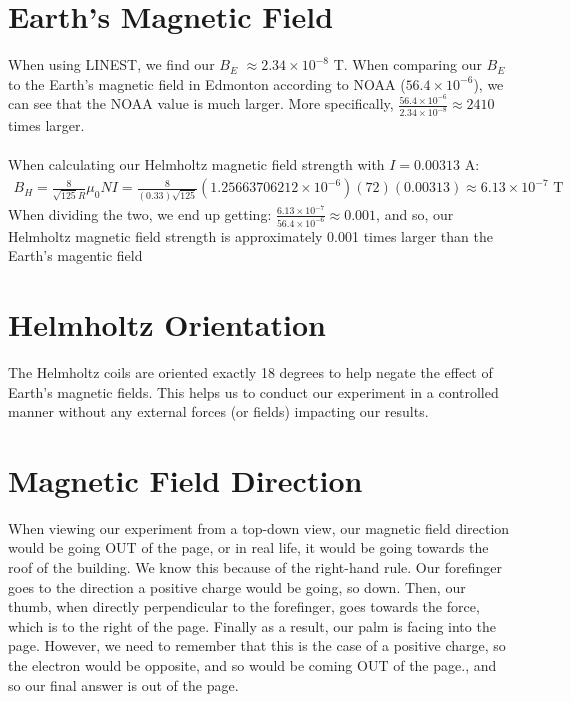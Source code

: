 \documentclass[12pt]{article}
\begin{document}
\section{Earth's Magnetic Field}
When using LINEST, we find our $B_E$ $\approx 2.34 \times 10^{-8}$ T.
When comparing our $B_E$ to the Earth's magnetic field in Edmonton according to NOAA ($56.4 \times 10^{-6}$), we can see that
the NOAA value is much larger. More specifically, $\frac{56.4 \times 10^{-6}}{2.34 \times 10^{-8}} \approx 2410$ times larger.
\\ \\
\noindent When calculating our Helmholtz magnetic field strength with $I = 0.00313$ A:
\begin{align*}
    B_H = \frac{8}{\sqrt{125}R}\mu_0NI = \frac{8}{(0.33)\sqrt{125}}(1.25663706212 \times 10^{-6})(72)(0.00313) \approx 6.13 \times 10^{-7}\text{ T}
\end{align*}
When dividing the two, we end up getting: $\frac{6.13 \times 10^{-7}}{56.4 \times 10^{-6}} \approx 0.001$, and so, our Helmholtz magnetic
field strength is approximately 0.001 times larger than the Earth's magentic field
\section{Helmholtz Orientation}
The Helmholtz coils are oriented exactly 18 degrees to help negate the effect of Earth's magnetic fields. This helps
us to conduct our experiment in a controlled manner without any external forces (or fields) impacting our results.
\section{Magnetic Field Direction}
When viewing our experiment from a top-down view, our magnetic field direction would be going OUT of the page, or in real life, it would be going towards
the roof of the building. We know this because of the right-hand rule. Our forefinger goes to the direction a positive charge would be going, so down.
Then, our thumb, when directly perpendicular to the forefinger, goes towards the force, which is to the right of the page.
Finally as a result, our palm is facing into the page. However, we need to remember that this is the case of a positive charge, so the electron would be opposite, and so
would be coming OUT of the page., and so our final answer is out of the page.
\end{document}
